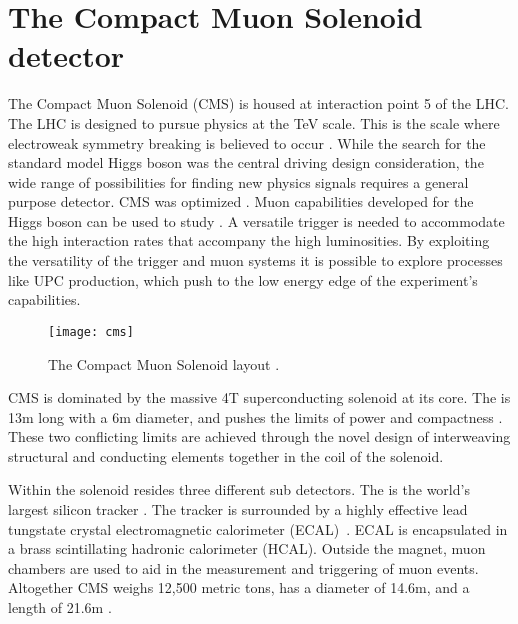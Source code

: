 \chapter{\label{ch:detector} The Compact Muon Solenoid detector}	
  The Compact Muon Solenoid (CMS) is housed at interaction point 5 of the 
    LHC. 
  The LHC is designed to pursue physics at the TeV scale. 
  This is the scale where electroweak symmetry breaking is believed to occur
  	\cite{CmsPTdrv2}.
  While the search for the standard model Higgs boson was the 
    central driving design consideration, the wide range of possibilities for
  	finding new physics signals requires a general purpose detector.
  CMS was optimized \DIFdelbegin {}\DIFdelend \DIFaddbegin {}\DIFaddend . 
  Muon capabilities developed for the Higgs boson \DIFaddbegin {}\DIFaddend can be used to study 
    \JPsi{}. 
  A versatile trigger is needed to accommodate the high interaction rates that 
    accompany the high luminosities. 
  By exploiting the versatility of the trigger and muon systems it
    is possible to explore processes like UPC \JPsi{} production, 
    which push to the low energy edge of the experiment's capabilities. 
  \begin{figure}[h]
    \centering
      \texttt{[image: cms]}
    \caption{The Compact Muon Solenoid layout \cite{tCmsE}.}
    \label{cms}
  \end{figure}

  CMS is dominated by the massive 4T 
  	superconducting solenoid at its core.
  The \DIFdelbegin {}\DIFdelend \DIFaddbegin {}\DIFaddend is 13m long with a 6m diameter, and pushes the limits of power
  	and compactness \cite{tCmsE}. 
  These two conflicting limits are achieved through the novel design of 
  	interweaving structural and conducting elements together in the coil of
  	the solenoid.

  Within the solenoid resides three different sub detectors.
  The \DIFdelbegin {}\DIFdelend \DIFaddbegin {}\DIFaddend is the world's largest silicon tracker \cite{tCmsE}.
  The tracker is surrounded by a highly effective lead tungstate crystal 
    electromagnetic calorimeter (ECAL)~\cite{CMS:2002xia}.
  ECAL is encapsulated in a brass scintillating hadronic calorimeter (HCAL).
  Outside the magnet, muon chambers are used to aid in the measurement and 
    triggering of muon events. 
  Altogether CMS weighs 12,500 metric tons, has a diameter of 14.6m,
    and a length of 21.6m \cite{tCmsE}.

